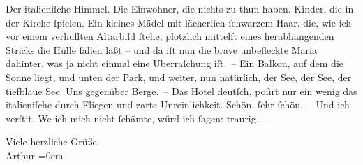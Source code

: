                Der italieniſche Himmel. Die Einwohner, die
               nichts zu thun haben. Kinder, die in der Kirche{ }ſpielen. Ein kleines Mädel mit
               lächerlich{ }ſchwarzem Haar, die, wie ich vor einem verhüllten Altarbild{ }ſtehe,
               plötzlich mittelſt eines herabhängenden Stricks die Hülle fallen läßt – und da iſt
               nun die brave unbefleckte Maria dahinter, was ja nicht einmal eine Überraſchung
               iſt. – Ein Balkon, auf dem die Sonne liegt, und unten der Park, und weiter, nun
               natürlich, der See, der See,
               der tiefblaue See. Uns
               gegenüber Berge. – Das Hotel deutſch, poſirt nur ein wenig das italieniſche durch Fliegen und zarte Unreinlichkeit. Schön,{ }ſehr{ }ſchön. – Und ich verſti{\geminationm}t. We{\geminationn} ich mich nicht{ }ſchämte, würd ich{ }ſagen: traurig. –\pend
           
\pstart
           Viele herzliche Grüße{\\[\baselineskip]}\spacefill\mbox{Arthur}\pend
           \leftskip=0em{}\endnumbering{}  \newcommand{\dateiname}{L00123}\newcommand{\titel}{Arthur Schnitzler an Richard Beer-Hofmann, 13. 9. 1892}\newcommand{\editorInnen}{Martin Anton Müller und Gerd-Hermann Susen}

